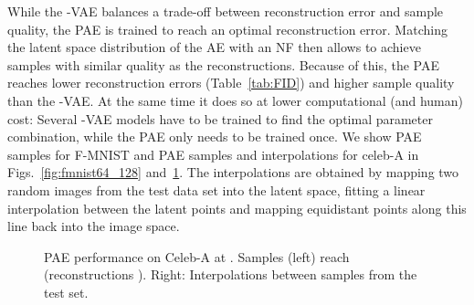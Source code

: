 \documentclass{article}
\begin{document}
While the -VAE balances a trade-off between reconstruction error and sample quality, the PAE is trained to reach an optimal reconstruction error. Matching the latent space distribution of the AE with an NF then allows to achieve samples with similar quality as the reconstructions. Because of this, the PAE reaches lower reconstruction errors (Table~\ref{tab:FID}) and higher sample quality than the -VAE. At the same time it does so at lower computational (and human) cost: Several -VAE models have to be trained to find the optimal parameter combination, while the PAE only needs to be trained once.
We show PAE samples for F-MNIST and PAE samples and interpolations for celeb-A in Figs.~\ref{fig:fmnist64_128} and~\ref{fig:celeba_samples}. The interpolations are obtained by mapping two random images from the test data set into the latent space, fitting a linear interpolation between the latent points and mapping equidistant points along this line back into the image space.
\begin{figure}
\end{figure}
\begin{figure}
\begin{subfigure}{0.4\textwidth}
\end{subfigure}
\begin{subfigure}{0.59\textwidth}
\end{subfigure}
\caption{PAE performance on Celeb-A at . Samples (left) reach  (reconstructions ). Right: Interpolations between samples from the test set.}
\label{fig:celeba_samples}
\end{figure}
\end{document}
